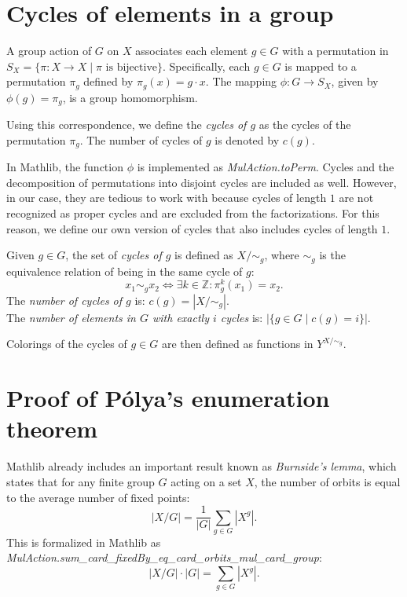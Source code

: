 \section{Cycles of elements in a group}

A group action of $G$ on $X$ associates each element $g \in G$ with a permutation in $S_X = \{\pi : X \to X \mid \pi \text{ is bijective}\}$. Specifically, each $g \in G$ is mapped to a permutation $\pi_g$ defined by $\pi_g(x) = g \cdot x$. The mapping $\phi : G \to S_X$, given by $\phi(g) = \pi_g$, is a group homomorphism. 

Using this correspondence, we define the \emph{cycles of $g$} as the cycles of the permutation $\pi_g$. The number of cycles of $g$ is denoted by $c(g)$.

In Mathlib, the function $\phi$ is implemented as \emph{MulAction.toPerm}. Cycles and the decomposition of permutations into disjoint cycles are included as well. However, in our case, they are tedious to work with because cycles of length $1$ are not recognized as proper cycles and are excluded from the factorizations. For this reason, we define our own version of cycles that also includes cycles of length $1$.

\begin{definition}
  \label{def:CyclesOfGroup}
  \leanok
  Given $g \in G$, the set of \emph{cycles of $g$} is defined as $X / \sim_g$, where $\sim_g$ is the equivalence relation of being in the same cycle of $g$:
  \begin{equation*}
    x_1 \sim_g x_2 \iff \exists k \in \mathbb{Z}: \pi_g^k(x_1) = x_2.
  \end{equation*}
  The \emph{number of cycles of $g$} is: $c(g) = |X / \sim_g|$.\\
  The \emph{number of elements in $G$ with exactly $i$ cycles} is: $|\{g \in G \mid c(g) = i\}|$.
\end{definition}

Colorings of the cycles of $g \in G$ are then defined as functions in $Y^{X / \sim_g}$.

\section{Proof of Pólya's enumeration theorem}

Mathlib already includes an important result known as \emph{Burnside's lemma}, which states that for any finite group $G$ acting on a set $X$, the number of orbits is equal to the average number of fixed points:
\begin{equation*}
  |X/G| = \frac{1}{|G|} \sum_{g \in G} |X^g|.
\end{equation*}
This is formalized in Mathlib as \emph{MulAction.sum\_card\_fixedBy\_eq\_card\_orbits\_mul\_card\_group}:
\begin{equation*}
  |X/G| \cdot |G| = \sum_{g \in G} |X^g|.
\end{equation*}

